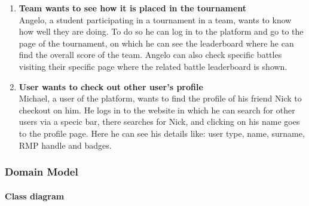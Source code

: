 \begin{enumerate}[label=$\bullet$ \textbf{SC\arabic*:}]
    \item \textbf{Team wants to see how it is placed in the tournament}\\ Angelo, a student participating in a tournament in a team, wants to know how well they are doing. To do so he can log in to the platform and go to the page of the tournament, on which he can see the leaderboard where he can find the overall score of the team. Angelo can also check specific battles visiting their specific page where the related battle leaderboard is shown.
    \item \textbf{User wants to check out other user's profile}\\ Michael, a user of the platform, wants to find the profile of his friend Nick to checkout on him. He logs in to the website in which he can search for other users via a specic bar, there searches for Nick, and clicking on his name goes to the profile page. Here he can see his details like: user type, name, surname, RMP handle and badges.
\end{enumerate}
\subsubsection{Domain Model}
\paragraph{Class diagram}

